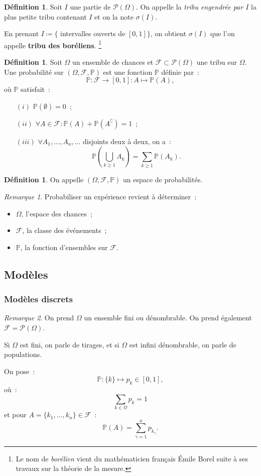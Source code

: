\documentclass{article}
\renewcommand{\P}{\mathbb P}
\newcommand{\espproba}[3]{\left(#1, #2, #3\right)}  %
\newcommand{\Ofp}{\espproba \Omega{\mathcal F}\P}  %
\theoremstyle{definition}
\newtheorem{déf}[thm]{Définition}
\theoremstyle{remark}
\newtheorem*{rmq}{Remarque}
\begin{document}
		\begin{déf}\label{boréliens} Soit $I$ une partie de $\mathcal P(\Omega)$. On appelle la \emph{tribu engendrée par $I$} la plus petite tribu contenant
		$I$ et on la note $\sigma(I)$.

		En prenant $I \coloneqq \{$ intervalles ouverts de $[0, 1]\}$, on obtient $\sigma(I)$ que l'on appelle \textbf{tribu des boréliens}.
		\footnote{Le nom de \emph{borélien} vient du mathématicien français Émile Borel suite à ses travaux sur la théorie de la mesure.} \end{déf}

		\begin{déf} Soit $\Omega$ un ensemble de chances et $\mathcal F \subset \mathcal P(\Omega)$ une tribu sur $\Omega$. Une probabilité sur
		$\Ofp$ est une fonction $\P$ définie par~:
		\[\P : \mathcal F \to [0, 1] : A \mapsto \P(A),\]
		où $\P$ satisfait~:

		\begin{itemize}
			\item[$(i)$] $\P(\emptyset) = 0$~;
			\item[$(ii)$] $\forall A \in \mathcal F : \P(A) + \P(A^\complement) = 1$~;
			\item[$(iii)$] $\forall A_1, \dotsc, A_n, \ldots$ disjoints deux à deux, on a~:
			               \[\P\left(\bigcup_{k \geq 1}A_k\right) = \sum_{k \geq 1}\P(A_k).\]
		\end{itemize}
		\end{déf}

		\begin{déf} On appelle $\Ofp$ un espace de probabilités. \end{déf}

		\begin{rmq} Probabiliser un expérience revient à déterminer~:
		\begin{itemize}
			\item $\Omega$, l'espace des chances~;
			\item $\mathcal F$, la classe des événements~;
			\item $\P$, la fonction d'ensembles sur $\mathcal F$.
		\end{itemize}
		\end{rmq}

	\subsection{Modèles}
		\subsubsection{Modèles discrets}
		\begin{rmq} On prend $\Omega$ un ensemble fini ou dénombrable. On prend également $\mathcal F = \mathcal P(\Omega)$.

		Si $\Omega$ est fini, on parle de tirages, et si $\Omega$ est infini dénombrable, on parle de populations.

		On pose~:
		\[\P : \{k\} \mapsto p_k \in [0, 1],\]
		où~:
		\[\sum_{k \in \Omega}p_k = 1\]
		et pour $A = \{k_1, \dotsc, k_n\} \in \mathcal F$~:
		\[\P(A) = \sum_{\gamma=1}^np_{k_\gamma}.\]
		\end{rmq}
\end{document}
